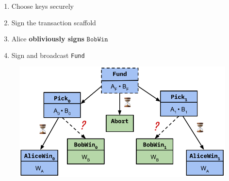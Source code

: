 \documentclass{beamer}
\begin{document}

\begin{frame}
\begin{multicols}{2}
\begin{enumerate}
    \item<2-> Choose keys securely
    \item<3-> Sign the transaction scaffold
    \item<4-> Alice \textbf{obliviously signs} $\texttt{BobWin}$
    \item<5-> Sign and broadcast \texttt{Fund}
\end{enumerate}
\end{multicols}
    \begin{figure}
        \centering
        \includegraphics[width=\textwidth]{oblivious_signing_3.png}
    \end{figure}
\end{frame}


\end{document}
